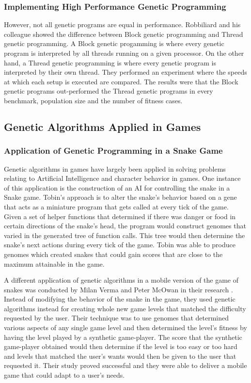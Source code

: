 \documentclass{acm_proc_article-sp}
\begin{document}
\subsubsection{Implementing High Performance Genetic Programming}
However, not all genetic programs are equal in performance. Robbiliard and his colleague showed the difference between
Block genetic programming and Thread genetic programming\cite{Robbilliard09}. A Block
genetic progamming is where every genetic program is interpreted by all threads running
on a given processor. On the other hand, a Thread genetic programming is where every genetic
program is interpreted by their own thread. They performed an experiment where
the speeds at which each setup is executed are compared. The results were that the Block genetic
programs out-performed the Thread genetic programs in every benchmark, population size and
the number of fitness cases.

\subsection{Genetic Algorithms Applied in Games}
\subsubsection{Application of Genetic Programming in a Snake Game}
Genetic algorithms in games have largely been applied in solving problems relating to
Artificial Intelligence and character behavior in games. One instance of this application
is the construction of an AI for controlling the snake in a Snake game\cite{Ehlis00}.
Tobin's approach is to alter the snake's behavior based on a gene that acts as a miniature
program that gets called at every tick of the game. Given a set of helper functions that
determined if there was danger or food in certain directions of the snake's head, the
program would construct genomes that varied in the generated tree of function calls. This
tree would then determine the snake's next actions during every tick of the game. Tobin
was able to produce genomes which created snakes that could gain scores that are close to
the maximum attainable in the game.  


A different application of genetic algorithms in a mobile version of the game of snakes
was conducted by Milan Verma and Peter McOwan in their research \cite{Verma05}. Instead
of modifying the behavior of the snake in the game, they used genetic algorithms instead
for creating whole new game levels that matched the difficulty requested by the user.
Their technique was to use genomes that determined various aspects of any single game
level and then determined the level's fitness by having the level played by a synthetic
game-player. The score that the synthetic game-player obtained would then determine if
the level is too easy or too hard and levels that matched the user's wants would then be
given to the user that requested it. Their study proved successful and they were able to
deliver a mobile game that could adapt to a user's needs.
\end{document}
